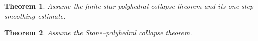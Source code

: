 \documentclass[11pt]{article}
\newtheorem{theorem}{Theorem}
\begin{document}
\begin{theorem}
\label{thm:p071-finite-star-polyhedral-collapse}
Assume the finite-star polyhedral collapse theorem and its one-step
smoothing estimate.
\end{theorem}
\begin{theorem}
\label{thm:p071-stone-polyhedral-collapse}
Assume the Stone--polyhedral collapse theorem.
\end{theorem}


\end{document}
